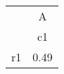 \begin{tabular}{l*{1}{c}}
\hline\hline
            &           A\\
            &          c1\\
\hline
r1          &        0.49\\
\hline\hline
\end{tabular}

